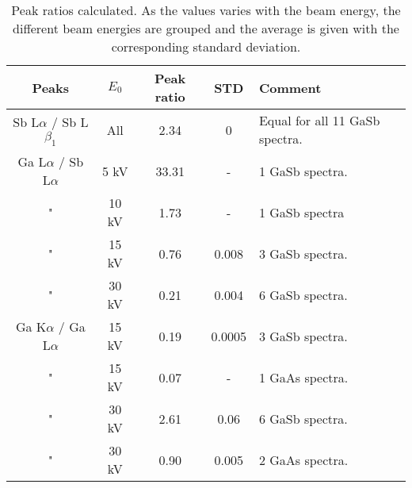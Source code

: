 \begin{table}[phtb]
    \begin{center}
        \caption{
            Peak ratios calculated.
            As the values varies with the beam energy, the different beam energies are grouped and the average is given with the corresponding standard deviation.
        }
        \renewcommand*{\arraystretch}{1.4}
        \label{tab:results:peak_ratios}
        \begin{tabular}{ccccl}
            \hline
            \textbf{Peaks}               & \textbf{$E_0$} & \textbf{Peak ratio} & \textbf{STD} & \textbf{Comment}               \\
            \hline
            Sb L$\alpha$ / Sb L$\beta_1$ & All            & 2.34                & 0            & Equal for all 11 GaSb spectra. \\
            Ga L$\alpha$ / Sb L$\alpha$  & 5 kV           & 33.31               & -            & 1 GaSb spectra.                \\
            "                            & 10 kV          & 1.73                & -            & 1 GaSb spectra                 \\
            "                            & 15 kV          & 0.76                & 0.008        & 3 GaSb spectra.                \\
            "                            & 30 kV          & 0.21                & 0.004        & 6 GaSb spectra.                \\
            Ga K$\alpha$ / Ga L$\alpha$  & 15 kV          & 0.19                & 0.0005       & 3 GaSb spectra.                \\
            "                            & 15 kV          & 0.07                & -            & 1 GaAs spectra.                \\
            "                            & 30 kV          & 2.61                & 0.06         & 6 GaSb spectra.                \\
            "                            & 30 kV          & 0.90                & 0.005        & 2 GaAs spectra.                \\
            \hline
        \end{tabular}
    \end{center}
\end{table}
